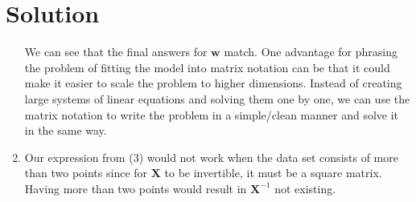 \documentclass{../harvardml}
\theoremstyle{definition}
\theoremstyle{plain}
\newenvironment{solution}
  {\color{blue}\section*{Solution}}
{}
\begin{document}
\begin{solution}
\begin{enumerate}
        We can see that the final answers for $\bm w$ match. One advantage for phrasing the problem of fitting the model into matrix notation can be that it could make it easier to scale the problem to higher dimensions. Instead of creating large systems of linear equations and solving them one by one, we can use the matrix notation to write the problem in a simple/clean manner and solve it in the same way.
        \item Our expression from (3) would not work when the data set consists of more than two points since for $\bm X$ to be invertible, it must be a square matrix. Having more than two points would result in $\bm X^{-1}$ not existing.
	\end{enumerate}
\end{solution}

\color{black}
\newpage
\end{document}
